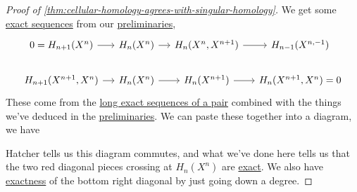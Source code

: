 \begin{proof}[Proof of \autoref{thm:cellular-homology-agrees-with-singular-homology}]\label{pf:thm:cellular-homology-agrees-with-singular-homology}
	We get some \hyperref[def:exact-sequence]{exact sequences} from our \hyperref[lma:lec-34]{preliminaries},
	\[
		\begin{tikzcd}[column sep=small]
			{0=H_{n+1}(X^n)} & {H_n(X^{n})} & {H_n(X^{n}, X^{n+1})} & {H_{n-1}(X^{n,-1})} \\
			{H_{n+1}(X^{n+1}, X^n)} & {H_n(X^n)} & {H_n(X^{n+1})} & {H_n(X^{n+1}, X^n)=0}
			\arrow[from=1-2, to=1-3]
			\arrow[from=1-3, to=1-4]
			\arrow[from=1-1, to=1-2]
			\arrow[from=2-1, to=2-2]
			\arrow[from=2-2, to=2-3]
			\arrow[from=2-3, to=2-4]
		\end{tikzcd}
	\]
	These come from the \hyperref[thm:long-exact-sequence-of-a-pair]{long exact sequences of a pair} combined with the things we've
	deduced in the \hyperref[lma:lec-34]{preliminaries}. We can paste these together into a diagram, we have
	\par

	\par Hatcher\cite{hatcher2002algebraic} tells us this diagram commutes, and what we've done here tells us that the two red diagonal pieces
	crossing at \(H_n(X^n)\) are \hyperref[def:exact]{exact}. We also have \hyperref[def:exact]{exactness} of the bottom right diagonal
	by just going down a degree.


\end{proof}
